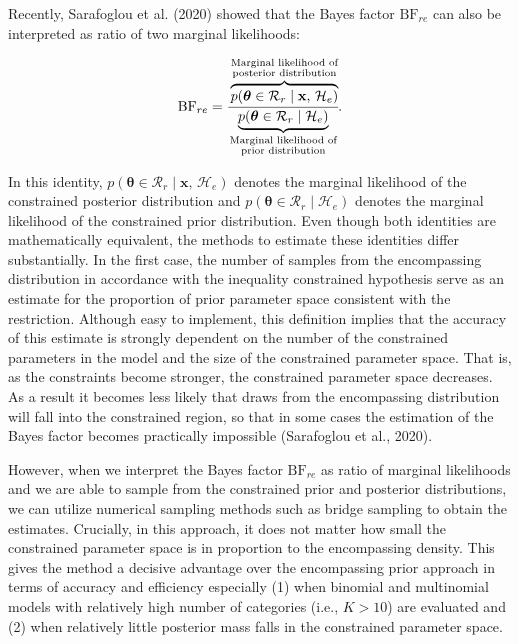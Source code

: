 \documentclass[
  english,
  man,floatsintext]{apa6}
\begin{document}
Recently, Sarafoglou et al. (2020) showed that the Bayes factor \(\text{BF}_{re}\) can also be interpreted as ratio of two marginal likelihoods:

\begin{align}
\label{Eq:sarafoglouIdentity}
\text{BF}_{re} =
\cfrac{\overbrace{p(\boldsymbol{\theta} \in \mathcal{R}_r \mid \mathbf{x}\text{, }\mathcal{H}_e)}^{\substack{\text{Marginal likelihood of}\\\text{posterior distribution}}}}{\underbrace{p(\boldsymbol{\theta} \in \mathcal{R}_r \mid  \mathcal{H}_e)}_{\substack{\text{Marginal likelihood of}\\\text{prior distribution}}}}.
\end{align}

In this identity, \(p(\boldsymbol{\theta} \in \mathcal{R}_r \mid \mathbf{x}\text{, }\mathcal{H}_e)\) denotes the marginal likelihood of the constrained posterior distribution and \(p(\boldsymbol{\theta} \in \mathcal{R}_r \mid \mathcal{H}_e)\) denotes the marginal likelihood of the constrained prior distribution. Even though both identities are mathematically equivalent, the methods to estimate these identities differ substantially.
In the first case, the number of samples from the encompassing distribution in accordance with the inequality constrained hypothesis serve as an estimate for the proportion of prior parameter space consistent with the restriction. Although easy to implement, this definition implies that the accuracy of this estimate is strongly dependent on the number of the constrained parameters in the model and the size of the constrained parameter space. That is, as the constraints become stronger, the constrained parameter space decreases. As a result it becomes less likely that draws from the encompassing distribution will fall into the constrained region, so that in some cases the estimation of the Bayes factor becomes practically impossible (Sarafoglou et al., 2020).

However, when we interpret the Bayes factor \(\text{BF}_{re}\) as ratio of marginal likelihoods and we are able to sample from the constrained prior and posterior distributions, we can utilize numerical sampling methods such as bridge sampling to obtain the estimates. Crucially, in this approach, it does not matter how small the constrained parameter space is in proportion to the encompassing density. This gives the method a decisive advantage over the encompassing prior approach in terms of accuracy and efficiency especially (1) when binomial and multinomial models with relatively high number of categories (i.e., \(K > 10\)) are evaluated and (2) when relatively little posterior mass falls in the constrained parameter space.
\end{document}
